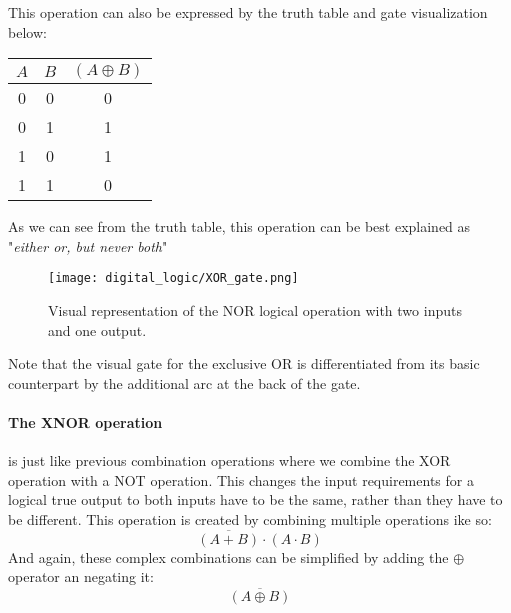     This operation can also be expressed by the truth table and gate visualization below:
    \begin{table}[h!]
        \begin{tabular}{c c | c}
            \toprule
            $A$ & $B$ & $(A \oplus B)$  \\
            \midrule
             0  &  0  &    0    \\
             0  &  1  &    1    \\
             1  &  0  &    1    \\
             1  &  1  &    0    \\
            \bottomrule
        \end{tabular}
    \end{table}

    As we can see from the truth table, this operation can be best explained as "\textit{either or, but never both}"

    \begin{figure}[h!]
        \texttt{[image: digital\_logic/XOR\_gate.png]}
        \caption[NOR Gate]{Visual representation of the NOR logical operation with two inputs and one output.}
    \end{figure}

    Note that the visual gate for the exclusive OR is differentiated from its basic counterpart by the additional arc at the back of the gate.

    \paragraph*{The XNOR operation} is just like previous combination operations where we combine the XOR operation with a NOT operation.
    This changes the input requirements for a logical true output to both inputs have to be the same, rather than they have to be different.
    This operation is created by combining multiple operations ike so:
    \begin{equation*}
        \overline{(A+B)} \cdot (A \cdot B)
    \end{equation*}
    And again, these complex combinations can be simplified by adding the $\oplus$ operator an negating it:
    \begin{equation*}
        \overline{(A \oplus B)}
    \end{equation*}


